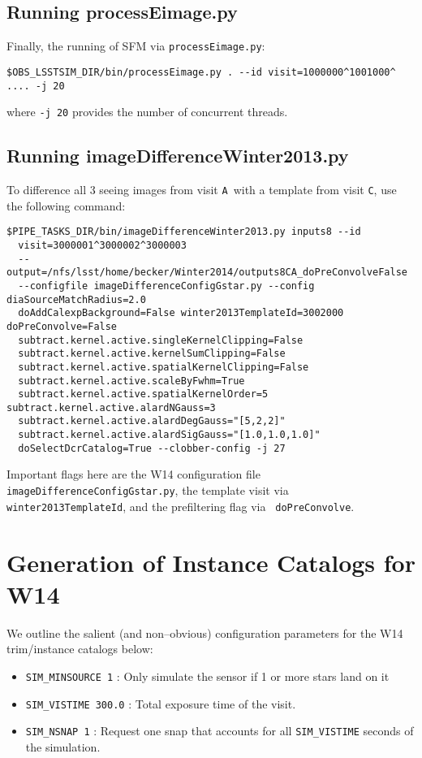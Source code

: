 \documentclass[prd, nofootinbib, floatfix, 11pt, tightenlines, times]{article}
\def\A{{\tt A}}
\def\C{{\tt C}}
\begin{document}
\begin{appendices}
\subsection{Running processEimage.py}

Finally, the running of SFM via {\tt processEimage.py}:

{\small
\begin{Verbatim}[frame=single]
$OBS_LSSTSIM_DIR/bin/processEimage.py . --id visit=1000000^1001000^ .... -j 20
\end{Verbatim}
}
where {\tt -j 20} provides the number of concurrent threads.

\subsection{Running imageDifferenceWinter2013.py}

To difference all 3 seeing images from visit \A\ with a template from visit \C,
use the following command:
{\small
\begin{Verbatim}[frame=single]
$PIPE_TASKS_DIR/bin/imageDifferenceWinter2013.py inputs8 --id 
  visit=3000001^3000002^3000003 
  --output=/nfs/lsst/home/becker/Winter2014/outputs8CA_doPreConvolveFalse 
  --configfile imageDifferenceConfigGstar.py --config diaSourceMatchRadius=2.0 
  doAddCalexpBackground=False winter2013TemplateId=3002000  doPreConvolve=False 
  subtract.kernel.active.singleKernelClipping=False 
  subtract.kernel.active.kernelSumClipping=False 
  subtract.kernel.active.spatialKernelClipping=False 
  subtract.kernel.active.scaleByFwhm=True 
  subtract.kernel.active.spatialKernelOrder=5 subtract.kernel.active.alardNGauss=3 
  subtract.kernel.active.alardDegGauss="[5,2,2]" 
  subtract.kernel.active.alardSigGauss="[1.0,1.0,1.0]" 
  doSelectDcrCatalog=True --clobber-config -j 27 
\end{Verbatim}
}

Important flags here are the W14 configuration file {\tt
  imageDifferenceConfigGstar.py}, the template visit via {\tt
  winter2013TemplateId}, and the prefiltering flag via {\tt
  doPreConvolve}.

\section{Generation of Instance Catalogs for W14 \label{appx:tasks}}

We outline the salient (and non--obvious) configuration parameters for
the W14 trim/instance catalogs below:
\begin{itemize}
  \item {\tt SIM\_MINSOURCE 1} : Only simulate the sensor if 1 or more
    stars land on it
  \item {\tt SIM\_VISTIME 300.0} : Total exposure time of the visit.
  \item {\tt SIM\_NSNAP 1} : Request one snap that accounts for all
    {\tt SIM\_VISTIME} seconds of the simulation.
\end{itemize}


\end{appendices}
\end{document}
